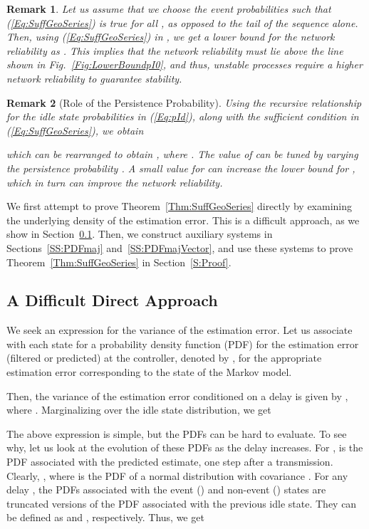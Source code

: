 \documentclass[twocolumn]{autart}
\newtheorem{remark}{Remark}[section]
\begin{document}
\begin{remark} \textbf{} \label{Remark:pI0}
Let us assume that we choose the event probabilities such that (\ref{Eq:SuffGeoSeries}) is true for all , as opposed to the tail of the sequence alone. Then, using (\ref{Eq:SuffGeoSeries}) in , we get a lower bound for the network reliability as . This implies that the network reliability must lie above the line shown in Fig.~\ref{Fig:LowerBoundpI0}, and thus, unstable processes require a higher network reliability to guarantee stability.
\end{remark}



\begin{remark}[Role of the Persistence Probability]
Using the recursive relationship for the idle state probabilities  in (\ref{Eq:pId}), along with the sufficient condition in (\ref{Eq:SuffGeoSeries}), we obtain

which can be rearranged to obtain , where . The value of  can be tuned by varying the persistence probability . A small value for  can increase the lower bound for , which in turn can improve the network reliability.
\end{remark}

We first attempt to prove Theorem~\ref{Thm:SuffGeoSeries} directly by examining the underlying density of the estimation error. This is a difficult approach, as we show in Section~\ref{SS:PDFevolve}. Then, we construct auxiliary systems in Sections~\ref{SS:PDFmaj} and~\ref{SS:PDFmajVector}, and use these systems to prove Theorem~\ref{Thm:SuffGeoSeries} in Section~\ref{S:Proof}.

\subsection{A Difficult Direct Approach} \label{SS:PDFevolve}
We seek an expression for the variance of the estimation error. Let us associate with each state  for  a probability density function (PDF) for the estimation error (filtered or predicted) at the controller, denoted by , for the appropriate estimation error corresponding to the state  of the Markov model.

Then, the variance of the estimation error conditioned on a delay  is given by , where . Marginalizing over the idle state distribution, we get

The above expression is simple, but the PDFs can be hard to evaluate. To see why, let us look at the evolution of these PDFs as the delay  increases. For ,  is the PDF associated with the predicted estimate, one step after a transmission. Clearly, , where  is the PDF of a normal distribution with covariance . For any delay , the PDFs associated with the event () and non-event () states are truncated versions of the PDF associated with the previous idle state. They can be defined as  and , respectively. Thus, we get
\end{document}
